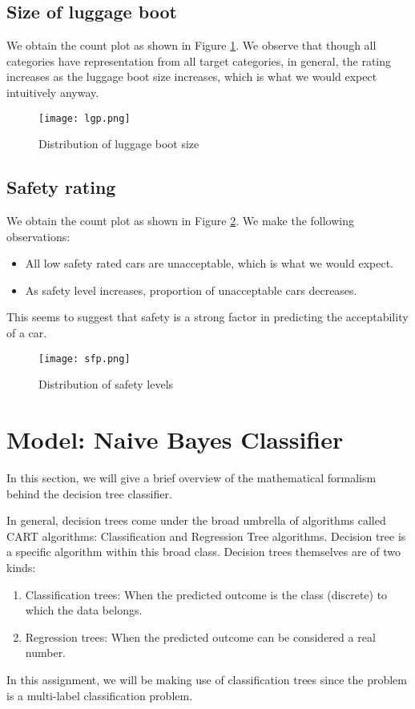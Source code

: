 \documentclass[conference]{IEEEtran}
\begin{document}
\subsection*{Size of luggage boot}

We obtain the count plot as shown in Figure \ref{lgp}. We observe that though all categories have representation from all target categories, in general, the rating increases as the luggage boot size increases, which is what we would expect intuitively anyway.

\begin{figure}[tbh]
\centering
\texttt{[image: lgp.png]}
\caption{Distribution of luggage boot size}
\label{lgp}
\end{figure}

\subsection*{Safety rating}

We obtain the count plot as shown in Figure \ref{sfp}. We make the following observations:

\begin{itemize}
    \item All low safety rated cars are unacceptable, which is what we would expect.
    \item As safety level increases, proportion of unacceptable cars decreases.
\end{itemize}

This seems to suggest that safety is a strong factor in predicting the acceptability of a car.

\begin{figure}[tbh]
\centering
\texttt{[image: sfp.png]}
\caption{Distribution of safety levels}
\label{sfp}
\end{figure}



\section{Model: Naive Bayes Classifier}

In this section, we will give a brief overview of the mathematical formalism behind the decision tree classifier. 

In general, decision trees come under the broad umbrella of algorithms called CART algorithms: Classification and Regression Tree algorithms. Decision tree is a specific algorithm within this broad class. Decision trees themselves are of two kinds:
\begin{enumerate}
    \item Classification trees: When the predicted outcome is the class (discrete) to which the data belongs.
    \item Regression trees:  When the predicted outcome can be considered a real number.
\end{enumerate}
In this assignment, we will be making use of classification trees since the problem is a multi-label classification problem.
\end{document}

